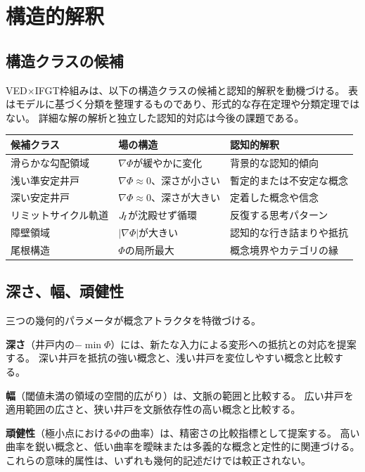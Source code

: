 \section{構造的解釈}
\label{sec:structural}

\subsection{構造クラスの候補}
VED$\times$IFGT枠組みは、以下の構造クラスの候補と認知的解釈を動機づける。
表はモデルに基づく分類を整理するものであり、形式的な存在定理や分類定理ではない。
詳細な解の解析と独立した認知的対応は今後の課題である。

\begin{center}
\renewcommand{\arraystretch}{1.5}
\begin{tabular}{p{}p{}p{}}
\toprule
\textbf{候補クラス} & \textbf{場の構造} & \textbf{認知的解釈} \\
\midrule
滑らかな勾配領域 & $\nabla\Phi$が緩やかに変化 & 背景的な認知的傾向 \\
浅い準安定井戸 & $\nabla\Phi\approx 0$、深さが小さい & 暫定的または不安定な概念 \\
深い安定井戸 & $\nabla\Phi\approx 0$、深さが大きい & 定着した概念や信念 \\
リミットサイクル軌道 & $J_{\!I}$が沈殿せず循環 & 反復する思考パターン \\
障壁領域 & $|\nabla\Phi|$が大きい & 認知的な行き詰まりや抵抗 \\
尾根構造 & $\Phi$の局所最大 & 概念境界やカテゴリの縁 \\
\bottomrule
\end{tabular}
\end{center}

\subsection{深さ、幅、頑健性}
三つの幾何的パラメータが概念アトラクタを特徴づける。

\textbf{深さ}（井戸内の$-\min\Phi$）には、新たな入力による変形への抵抗との対応を提案する。
深い井戸を抵抗の強い概念と、浅い井戸を変位しやすい概念と比較する。

\textbf{幅}（閾値未満の領域の空間的広がり）は、文脈の範囲と比較する。
広い井戸を適用範囲の広さと、狭い井戸を文脈依存性の高い概念と比較する。

\textbf{頑健性}（極小点における$\Phi$の曲率）は、精密さの比較指標として提案する。
高い曲率を鋭い概念と、低い曲率を曖昧または多義的な概念と定性的に関連づける。
これらの意味的属性は、いずれも幾何的記述だけでは較正されない。

